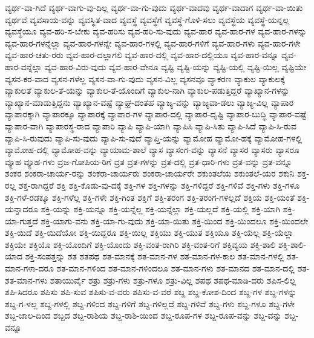 {ವ್ಯರ್ಥ-ವಾ-ಗಿದೆ
ವ್ಯರ್ಥ-ವಾಗು-ವು-ದಿಲ್ಲ
ವ್ಯರ್ಥ-ವಾ-ಗು-ವುದು
ವ್ಯರ್ಥ-ವಾದವು
ವ್ಯರ್ಥ-ವಾದಾಗ
ವ್ಯರ್ಥ-ವಾ-ಯಿತು
ವ್ಯರ್ಥವೆ
ವ್ಯವಸಾಯ-ವನ್ನು
ವ್ಯವಸ್ಥಿತ-ವಾದ
ವ್ಯವಸ್ಥೆ
ವ್ಯವಸ್ಥೆಗೆ
ವ್ಯವಸ್ಥೆ-ಗೊಳಿ-ಸಲು
ವ್ಯವಸ್ಥೆಯ
ವ್ಯವಸ್ಥೆ-ಯನ್ನಲ್ಲ
ವ್ಯವಸ್ಥೆಯೂ
ವ್ಯವ-ಹರಿ-ಸ-ಬೇಕು
ವ್ಯವ-ಹರಿಸು
ವ್ಯವ-ಹರಿ-ಸು-ವುದು
ವ್ಯವ-ಹಾರ
ವ್ಯವ-ಹಾರ-ಗಳ
ವ್ಯವ-ಹಾರ-ಗಳನ್ನು
ವ್ಯವ-ಹಾರ-ಗಳನ್ನೆಲ್ಲಾ
ವ್ಯವ-ಹಾರ-ಗಳನ್ನೇ
ವ್ಯವ-ಹಾರ-ಗಳಲ್ಲಿ
ವ್ಯವ-ಹಾರ-ಗಳಿಗೆ
ವ್ಯವ-ಹಾರ-ಗಳು
ವ್ಯವ-ಹಾರ-ಗಳೇ
ವ್ಯವ-ಹಾರ-ಚತು-ರರು
ವ್ಯವ-ಹಾರ-ದಲ್ಲಾಗಲಿ
ವ್ಯವ-ಹಾರ-ದಲ್ಲಿ
ವ್ಯವ-ಹಾರ-ದಲ್ಲಿಯೂ
ವ್ಯವ-ಹಾರ-ವನ್ನೂ
ವ್ಯವ-ಹಾರ-ವನ್ನೆಲ್ಲಾ
ವ್ಯವ-ಹಾರ-ವಿರು-ವುದು
ವ್ಯವ-ಹಾರ-ವೇನೂ
ವ್ಯಷ್ಟಿ
ವ್ಯಷ್ಟಿ-ಯನ್ನು
ವ್ಯಷ್ಟಿ-ಯಲ್ಲಿ
ವ್ಯಷ್ಟಿ-ಯಿಲ್ಲ
ವ್ಯಷ್ಟಿಯೇ
ವ್ಯಸನ-ಕರ-ವಾದ
ವ್ಯಸನ-ಗಳೆಲ್ಲ
ವ್ಯಸನ-ವಾ-ಗು-ವುದು
ವ್ಯಸನ-ವಿಲ್ಲ
ವ್ಯಸನವೂ
ವ್ಯಾಕರಣ
ವ್ಯಾಕುಲ
ವ್ಯಾಕುಲಕ್ಕೆ
ವ್ಯಾಕುಲತೆ
ವ್ಯಾಕುಲ-ತೆ-ಯನ್ನು
ವ್ಯಾಕುಲ-ತೆ-ಯೊಂದಿಗೆ
ವ್ಯಾಕುಲ-ನಾಗಿ
ವ್ಯಾಕುಲ-ಪಡುತ್ತಿದ್ದರೆ
ವ್ಯಾಖ್ಯಾನ-ಗಳನ್ನು
ವ್ಯಾಖ್ಯಾನ-ಮಾಡುತ್ತಿದ್ದನು
ವ್ಯಾಖ್ಯಾನ-ವಷ್ಟೆ
ವ್ಯಾಘ್ರ-ದಂತಹ
ವ್ಯಾಜ್ಯ-ವನ್ನು
ವ್ಯಾಜ್ಯವಾ-ಡಲು
ವ್ಯಾಜ್ಯ-ವಿಲ್ಲ
ವ್ಯಾಪಾರ
ವ್ಯಾಪಾರಕ್ಕಾಗಿ
ವ್ಯಾಪಾರಕ್ಕೂ
ವ್ಯಾಪಾರಕ್ಕೆ
ವ್ಯಾಪಾರ-ಗಳ
ವ್ಯಾಪಾರ-ದಲ್ಲಿ
ವ್ಯಾಪಾರ-ದೃಷ್ಟಿ
ವ್ಯಾಪಾರ-ಬುದ್ಧಿ
ವ್ಯಾಪಾರ-ವಷ್ಟೆ
ವ್ಯಾಪಾರ-ವಾಗಿ
ವ್ಯಾಪಾರಸ್ಥ-ರಾದ
ವ್ಯಾಪಾರಿ
ವ್ಯಾಪಿ
ವ್ಯಾಪಿ-ಯಾಗಿ
ವ್ಯಾಪಿಸಿ
ವ್ಯಾಪಿ-ಸಿತು
ವ್ಯಾಪಿ-ಸಿದೆ
ವ್ಯಾಪಿ-ಸಿ-ರುವ
ವ್ಯಾಪಿ-ಸಿ-ರುವುದು
ವ್ಯಾಪಿ-ಸು-ವುದು
ವ್ಯಾಪಿ-ಸು-ವುದೆ
ವ್ಯಾಪ್ತಿ-ಯನ್ನು
ವ್ಯಾಮೋಹ
ವ್ಯಾಮೋ-ಹಕ್ಕೆ
ವ್ಯಾಮೋಹ-ಗಳಲ್ಲಿ
ವ್ಯಾಮೋಹ-ದಲ್ಲಿ
ವ್ಯಾಮೋಹ-ವನ್ನು
ವ್ಯಾಯಾಮ-ಶಾಲೆ
ವ್ಯಾಸ
ವ್ಯಾಸಂಗ-ವನ್ನು
ವ್ಯಾಸನೆ
ವ್ಯಾಸರ
ವ್ಯಾಸರು
ವ್ಯಾಸರೂ
ವ್ಯೂಹ
ವ್ಯೂಹ-ಗಳು
ವ್ರಜ-ಗೋಪಿಯ-ರಿಗೆ
ವ್ರತ
ವ್ರತ-ಗಳನ್ನು
ವ್ರತ-ದಲ್ಲಿ
ವ್ರತ-ಧಾರಿ-ಗಳು
ವ್ರತ-ವನ್ನು
ವ್ರತ-ವನ್ನೂ
ಶಂಕರ
ಶಂಕರಾ-ಚಾರ್ಯ-ರನ್ನು
ಶಂಕರಾ-ಚಾರ್ಯರು
ಶಂಕರಾ-ಚಾರ್ಯರೇ
ಶಕುಂತಲೆಯ
ಶಕುಂತಲೆ-ಯರ
ಶಕುನಿ
ಶಕ್ತ-ರಲ್ಲ
ಶಕ್ತ-ರಾಗಿದ್ದರೆ
ಶಕ್ತಿ
ಶಕ್ತಿ-ಕೊಡು-ವು-ದಕ್ಕೆ
ಶಕ್ತಿ-ಗಳ
ಶಕ್ತಿ-ಗಳನ್ನು
ಶಕ್ತಿ-ಗಳಿದ್ದರೆ
ಶಕ್ತಿ-ಗಳಿವೆ
ಶಕ್ತಿ-ಗಳು
ಶಕ್ತಿ-ಗಳೂ
ಶಕ್ತಿ-ಗಳೆ-ರಡಕ್ಕೂ
ಶಕ್ತಿ-ಗಳೆಲ್ಲ
ಶಕ್ತಿ-ಗಳೇ
ಶಕ್ತಿ-ಗಿಂತ
ಶಕ್ತಿಗೆ
ಶಕ್ತಿ-ತರಂಗ
ಶಕ್ತಿ-ತರಂಗ-ಗಳಲ್ಲದೆ
ಶಕ್ತಿಯ
ಶಕ್ತಿ-ಯಂತೆ
ಶಕ್ತಿ-ಯನ್ನಾದರೂ
ಶಕ್ತಿ-ಯನ್ನು
ಶಕ್ತಿ-ಯನ್ನೂ
ಶಕ್ತಿ-ಯನ್ನೆಲ್ಲ
ಶಕ್ತಿ-ಯನ್ನೆಲ್ಲಾ
ಶಕ್ತಿ-ಯಲ್ಲದೆ
ಶಕ್ತಿ-ಯಲ್ಲಿ
ಶಕ್ತಿ-ಯಾಗಿ
ಶಕ್ತಿ-ಯಾ-ಗುತ್ತದೆ
ಶಕ್ತಿ-ಯಾಗು-ವನು
ಶಕ್ತಿ-ಯಾ-ಗು-ವುದು
ಶಕ್ತಿ-ಯಾ-ಯಿತು
ಶಕ್ತಿ-ಯಿಂದ
ಶಕ್ತಿ-ಯಿಂದಲೂ
ಶಕ್ತಿ-ಯಿಂದಲೇ
ಶಕ್ತಿ-ಯಿದೆ
ಶಕ್ತಿ-ಯಿದೆಯೋ
ಶಕ್ತಿ-ಯಿದ್ದರೂ
ಶಕ್ತಿ-ಯಿಲ್ಲ
ಶಕ್ತಿಯು
ಶಕ್ತಿ-ಯುತ
ಶಕ್ತಿಯೂ
ಶಕ್ತಿ-ಯೆಲ್ಲ
ಶಕ್ತಿ-ಯೆಲ್ಲಾ
ಶಕ್ತಿಯೇ
ಶಕ್ತಿಯೊ
ಶಕ್ತಿ-ಯೊಂದಿಗೆ
ಶಕ್ತಿ-ಯೊಂದು
ಶಕ್ತಿ-ವಂತ-ರಾಗಿರಿ
ಶಕ್ತಿ-ವಂತ-ರಿಗೆ
ಶಕ್ತಿವ್ಯಯ
ಶಕ್ತಿ-ಶಾಲಿ
ಶಕ್ತಿ-ಶಾಲಿ-ಯಾದ
ಶಕ್ತಿ-ಸಂಪತ್ತನ್ನು
ಶತ
ಶತಪಥ
ಶತ-ಮಾನಕ್ಕೆ
ಶತ-ಮಾನ-ಗಳ
ಶತ-ಮಾನ-ಗಳ-ಕಾಲ
ಶತ-ಮಾನ-ಗಳಲ್ಲಿ
ಶತ-ಮಾನ-ಗಳಾ-ದರೂ
ಶತ-ಮಾನ-ಗಳಿಂದ
ಶತ-ಮಾನ-ಗಳಿಂದಲೂ
ಶತ-ಮಾನ-ಗಳು
ಶತ-ಮಾನದ
ಶತ-ಮಾನ-ದಲ್ಲಿ
ಶತ-ಶತ-ಮಾನ-ಗಳು
ಶತಾಯುರ್ವೈ
ಶತ್ರು
ಶತ್ರು-ಗಳು
ಶತ್ರು-ಗಳೂ
ಶತ್ರು-ವಿಲ್ಲ
ಶಪಥ
ಶಪಥ-ಮಾಡಿ-ದರು
ಶಪಿಸ-ಲಿಲ್ಲ
ಶಪಿ-ಸಿದರೂ
ಶಪಿಸು
ಶಪಿ-ಸುವ
ಶಪಿಸು-ವ-ವರು
ಶಪಿಸು-ವ-ವರೆ
ಶಬ್ದ
ಶಬ್ದ-ಕೋಶ-ದಿಂದ
ಶಬ್ದ-ಗಳ
ಶಬ್ದ-ಗಳನ್ನು
ಶಬ್ದ-ಗ-ಳಲ್ಲ
ಶಬ್ದ-ಗಳಲ್ಲಿ
ಶಬ್ದ-ಗಳಿಂದ
ಶಬ್ದ-ಗಳಿಗೆ
ಶಬ್ದ-ಗಳಿಲ್ಲದೆ
ಶಬ್ದ-ಗಳಿವೆ
ಶಬ್ದ-ಗಳು
ಶಬ್ದ-ಗಳೂ
ಶಬ್ದ-ಗಳೇ
ಶಬ್ದ-ಜಾಲ-ದಿಂದ
ಶಬ್ದದ
ಶಬ್ದ-ರಾಶಿಯ
ಶಬ್ದ-ರಾಶಿ-ಯಿಂದ
ಶಬ್ದ-ರೂಪ-ಗಳ
ಶಬ್ದ-ರೂಪ-ವನ್ನು
ಶಬ್ದ-ವನ್ನು
ಶಬ್ದ-ವನ್ನೂ
}
